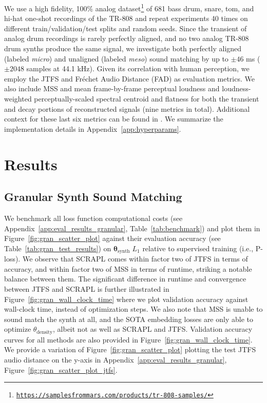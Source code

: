 \documentclass{article} %
\theoremstyle{plain}
\theoremstyle{definition}
\theoremstyle{remark}
\begin{document}
We use a high fidelity, 100\% analog dataset\footnote{\texttt{\url{https://samplesfrommars.com/products/tr-808-samples/}}} of 681 bass drum, snare, tom, and hi-hat one-shot recordings of the TR-808 and repeat experiments 40 times on different train/validation/test splits and random seeds.
Since the transient of analog drum recordings is rarely perfectly aligned, and no two analog TR-808 drum synths produce the same signal, we investigate both perfectly aligned (labeled \emph{micro}) and unaligned (labeled \emph{meso}) sound matching by up to $\pm 46$ ms ($\pm 2048$ samples at 44.1 kHz). 
Given its correlation with human perception, we employ the JTFS and Fréchet Audio Distance (FAD) \citep{kilgour2019interspeech, defossez2023high} as evaluation metrics. 
We also include MSS and mean frame-by-frame perceptual loudness and loudness-weighted perceptually-scaled spectral centroid and flatness for both the transient and decay portions of reconstructed signals (nine metrics in total). 
Additional context for these last six metrics can be found in \cite{shier2024realtime}. 
We summarize the implementation details in Appendix~\ref{app:hyperparams}.


\section{Results}
\label{sec:results}

\subsection{Granular Synth Sound Matching}
\label{ssec:results_granular}
\vspace{-3pt}

We benchmark all loss function computational costs (see Appendix~\ref{app:eval_results_granular}, Table~\ref{tab:benchmark}) and plot them in Figure~\ref{fig:gran_scatter_plot} against their evaluation accuracy (see Table~\ref{tab:gran_test_results}) on $\boldsymbol{\theta_{\mathrm{synth}}} \; L_1$ relative to supervised training (i.e., P-loss).
We observe that SCRAPL comes within factor two of JTFS in terms of accuracy, and within factor two of MSS in terms of runtime, striking a notable balance between them.
The significant difference in runtime and convergence between JTFS and SCRAPL is further illustrated in Figure~\ref{fig:gran_wall_clock_time} where we plot validation accuracy against wall-clock time, instead of optimization steps.
We also note that MSS is unable to sound match the synth at all, and the SOTA embedding losses are only able to optimize $\theta_{\mathrm{density}}$, albeit not as well as SCRAPL and JTFS.
Validation accuracy curves for all methods are also provided in Figure~\ref{fig:gran_wall_clock_time}.
We provide a variation of Figure~\ref{fig:gran_scatter_plot} plotting the test JTFS audio distance on the y-axis in Appendix~\ref{app:eval_results_granular}, Figure~\ref{fig:gran_scatter_plot_jtfs}.
\end{document}

